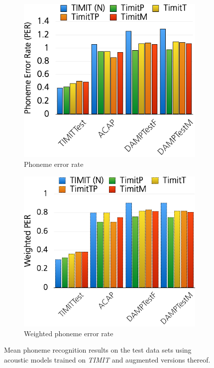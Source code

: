 \begin{figure}
	\centering
	\begin{subfigure}[t]{0.5\textwidth}
		\includegraphics[width=\textwidth]{images/res_songify_per.png}
		\caption{Phoneme error rate}
		
	\end{subfigure}%
	\begin{subfigure}[t]{0.5\textwidth}
		\includegraphics[width=\textwidth]{images/res_songify_wper.png}
		\caption{Weighted phoneme error rate}
	\end{subfigure}
	\caption{Mean phoneme recognition results on the test data sets using acoustic models trained on \textit{TIMIT} and augmented versions thereof.}\label{fig:res_songify}
\end{figure}
